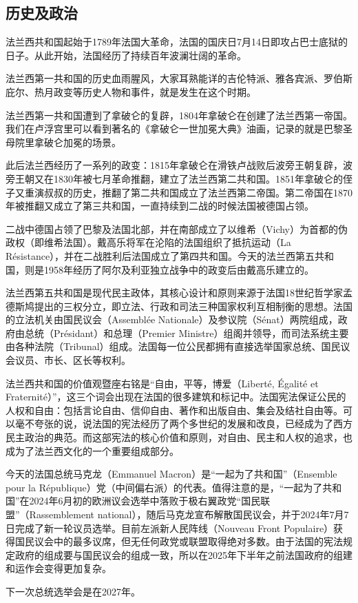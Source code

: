 \subsection{历史及政治}

法兰西共和国起始于1789年法国大革命，法国的国庆日7月14日即攻占巴士底狱的日子。从此开始，法国经历了持续百年波澜壮阔的革命。

法兰西第一共和国的历史血雨腥风，大家耳熟能详的吉伦特派、雅各宾派、罗伯斯庇尔、热月政变等历史人物和事件，就是发生在这个时期。

法兰西第一共和国遭到了拿破仑的复辟，1804年拿破仑在创建了法兰西第一帝国。我们在卢浮宫里可以看到著名的《拿破仑一世加冕大典》油画，记录的就是巴黎圣母院里拿破仑加冕的场景。

此后法兰西经历了一系列的政变：1815年拿破仑在滑铁卢战败后波旁王朝复辟，波旁王朝又在1830年被七月革命推翻，建立了法兰西第二共和国。1851年拿破仑的侄子又重演叔叔的历史，推翻了第二共和国成立了法兰西第二帝国。第二帝国在1870年被推翻又成立了第三共和国，一直持续到二战的时候法国被德国占领。

二战中德国占领了巴黎及法国北部，并在南部成立了以维希（Vichy）为首都的伪政权（即维希法国）。戴高乐将军在沦陷的法国组织了抵抗运动（La Résistance），并在二战胜利后法国成立了第四共和国。今天的法兰西第五共和国，则是1958年经历了阿尔及利亚独立战争中的政变后由戴高乐建立的。

法兰西第五共和国是现代民主政体，其核心设计和原则来源于法国18世纪哲学家孟德斯鸠提出的三权分立，即立法、行政和司法三种国家权利互相制衡的思想。法国的立法机关由国民议会（Assemblée Nationale）及参议院（Sénat）两院组成，政府由总统（Présidant）和总理（Premier Ministre）组阁并领导，而司法系统主要由各种法院（Tribunal）组成。法国每一位公民都拥有直接选举国家总统、国民议会议员、市长、区长等权利。

法兰西共和国的价值观暨座右铭是“自由，平等，博爱（Liberté, Égalité et Fraternité）”，这三个词会出现在法国的很多建筑和标记中。法国宪法保证公民的人权和自由：包括言论自由、信仰自由、著作和出版自由、集会及结社自由等。可以毫不夸张的说，说法国的宪法经历了两个多世纪的发展和改良，已经成为了西方民主政治的典范。而这部宪法的核心价值和原则，对自由、民主和人权的追求，也成为了法兰西文化的一个重要组成部分。

今天的法国总统马克龙（Emmanuel Macron）是“一起为了共和国”（Ensemble pour la République）党（中间偏右派）的代表。值得注意的是，“一起为了共和国”在2024年6月初的欧洲议会选举中落败于极右翼政党“国民联盟”（Rassemblement national），随后马克龙宣布解散国民议会，并于2024年7月7日完成了新一轮议员选举。目前左派新人民阵线（Nouveau Front Populaire）获得国民议会中的最多议席，但无任何政党或联盟取得绝对多数。由于法国的宪法规定政府的组成要与国民议会的组成一致，所以在2025年下半年之前法国政府的组建和运作会变得更加复杂。

下一次总统选举会是在2027年。
